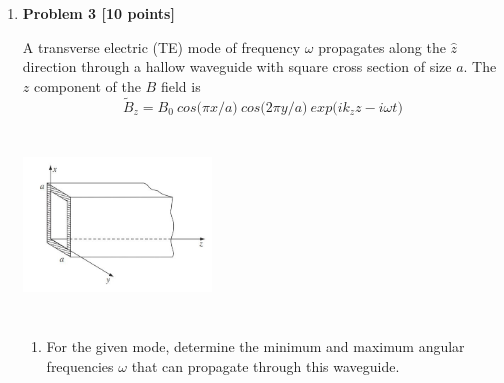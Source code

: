 \documentclass[fleqn]{article}
\begin{document}
\begin{enumerate}
\begin{enumerate}
          \textcolor{hwColor}{
            \\
          }

    \end{enumerate}

  \pagebreak

  \item \textbf{Problem 3 [10 points]} 
  
  A transverse electric (TE) mode of frequency $\omega$ propagates along the $\hat{z}$
  direction through a hallow waveguide with square cross section of size $a$. The $z$ component of the $B$ field is
  $$
    \tilde{B}_z=B_0 ~ cos \bigg( \pi x/a \bigg) ~ cos \bigg( 2 \pi y/a \bigg) ~ exp\bigg( i k_z z-i \omega t\bigg)
  $$

    \begin{center}
      \includegraphics[height=5cm, width=5cm]{3.JPG}
    \end{center}

    \begin{enumerate}
      \item For the given mode, determine the minimum and maximum angular frequencies $\omega$ that can
      propagate through this waveguide.


\end{enumerate}
\end{enumerate}
\end{document}

